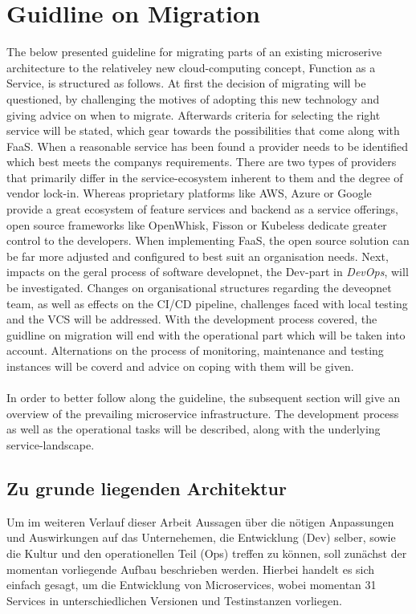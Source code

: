 \documentclass[11pt]{article}
\begin{document}
\section{Guidline on Migration}
The below presented guideline for migrating parts of an existing microserive architecture to the relativeley new cloud-computing concept, Function as a Service, is structured as follows. At first the decision of migrating will be questioned, by challenging the motives of adopting this new technology and giving advice on when to migrate. Afterwards criteria for selecting the right service will be stated, which gear towards the possibilities that come along with FaaS. When a reasonable service has been found a provider needs to be identified which best meets the companys requirements. There are two types of providers that primarily differ in the service-ecosystem inherent to them and the degree of vendor lock-in. Whereas proprietary platforms like AWS, Azure or Google provide a great ecosystem of feature services and backend as a service offerings, open source frameworks like OpenWhisk, Fisson or Kubeless dedicate greater control to the developers. When implementing FaaS, the open source solution can be far more adjusted and configured to best suit an organisation needs. Next, impacts on the geral process of software developnet, the \glqq Dev\grqq{}-part in \textit{DevOps}, will be investigated. Changes on organisational structures regarding the deveopnet team, as well as effects on the CI/CD pipeline, challenges faced with local testing and the VCS will be addressed. With the development process covered, the guidline on migration will end with the operational part which will be taken into account. Alternations on the process of monitoring, maintenance and testing instances will be coverd and advice on coping with them will be given. \\\\
In order to better follow along the guideline, the subsequent section will give an overview of the prevailing microservice infrastructure. The development process as well as the operational tasks will be described, along with the underlying service-landscape.

\subsection{Zu grunde liegenden Architektur}
Um im weiteren Verlauf dieser Arbeit Aussagen über die nötigen Anpassungen und Auswirkungen auf das Unternehemen, die Entwicklung (Dev) selber, sowie die Kultur und den operationellen Teil (Ops) treffen zu können, soll zunächst der momentan vorliegende Aufbau beschrieben werden. Hierbei handelt es sich einfach gesagt, um die Entwicklung von Microservices, wobei momentan 31 Services in unterschiedlichen Versionen und Testinstanzen vorliegen. 
\end{document}
